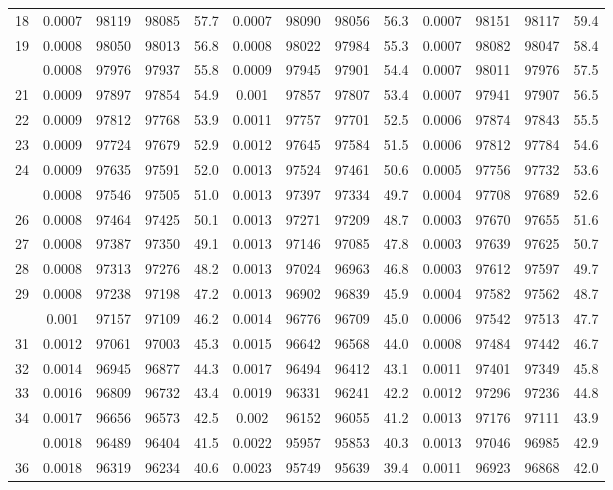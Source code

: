\documentclass[
  14pt,
]{article}
\begin{document}
\begin{longtable}[t]{lcccccccccccc}
18 & 0.0007 & 98119 & 98085 & 57.7 & 0.0007 & 98090 & 98056 & 56.3 & 0.0007 & 98151 & 98117 & 59.4\\
19 & 0.0008 & 98050 & 98013 & 56.8 & 0.0008 & 98022 & 97984 & 55.3 & 0.0007 & 98082 & 98047 & 58.4\\
\addlinespace
20 & 0.0008 & 97976 & 97937 & 55.8 & 0.0009 & 97945 & 97901 & 54.4 & 0.0007 & 98011 & 97976 & 57.5\\
21 & 0.0009 & 97897 & 97854 & 54.9 & 0.001 & 97857 & 97807 & 53.4 & 0.0007 & 97941 & 97907 & 56.5\\
22 & 0.0009 & 97812 & 97768 & 53.9 & 0.0011 & 97757 & 97701 & 52.5 & 0.0006 & 97874 & 97843 & 55.5\\
23 & 0.0009 & 97724 & 97679 & 52.9 & 0.0012 & 97645 & 97584 & 51.5 & 0.0006 & 97812 & 97784 & 54.6\\
24 & 0.0009 & 97635 & 97591 & 52.0 & 0.0013 & 97524 & 97461 & 50.6 & 0.0005 & 97756 & 97732 & 53.6\\
\addlinespace
25 & 0.0008 & 97546 & 97505 & 51.0 & 0.0013 & 97397 & 97334 & 49.7 & 0.0004 & 97708 & 97689 & 52.6\\
26 & 0.0008 & 97464 & 97425 & 50.1 & 0.0013 & 97271 & 97209 & 48.7 & 0.0003 & 97670 & 97655 & 51.6\\
27 & 0.0008 & 97387 & 97350 & 49.1 & 0.0013 & 97146 & 97085 & 47.8 & 0.0003 & 97639 & 97625 & 50.7\\
28 & 0.0008 & 97313 & 97276 & 48.2 & 0.0013 & 97024 & 96963 & 46.8 & 0.0003 & 97612 & 97597 & 49.7\\
29 & 0.0008 & 97238 & 97198 & 47.2 & 0.0013 & 96902 & 96839 & 45.9 & 0.0004 & 97582 & 97562 & 48.7\\
\addlinespace
30 & 0.001 & 97157 & 97109 & 46.2 & 0.0014 & 96776 & 96709 & 45.0 & 0.0006 & 97542 & 97513 & 47.7\\
31 & 0.0012 & 97061 & 97003 & 45.3 & 0.0015 & 96642 & 96568 & 44.0 & 0.0008 & 97484 & 97442 & 46.7\\
32 & 0.0014 & 96945 & 96877 & 44.3 & 0.0017 & 96494 & 96412 & 43.1 & 0.0011 & 97401 & 97349 & 45.8\\
33 & 0.0016 & 96809 & 96732 & 43.4 & 0.0019 & 96331 & 96241 & 42.2 & 0.0012 & 97296 & 97236 & 44.8\\
34 & 0.0017 & 96656 & 96573 & 42.5 & 0.002 & 96152 & 96055 & 41.2 & 0.0013 & 97176 & 97111 & 43.9\\
\addlinespace
35 & 0.0018 & 96489 & 96404 & 41.5 & 0.0022 & 95957 & 95853 & 40.3 & 0.0013 & 97046 & 96985 & 42.9\\
36 & 0.0018 & 96319 & 96234 & 40.6 & 0.0023 & 95749 & 95639 & 39.4 & 0.0011 & 96923 & 96868 & 42.0\\

\end{longtable}
\end{document}
